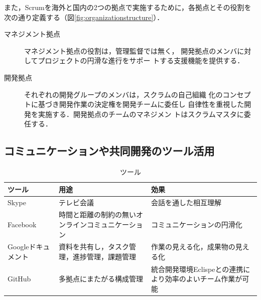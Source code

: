 \documentclass[a4j, 12Q, twocolumn, twoside]{jsarticle}
\begin{document}
また，Scrumを海外と国内の2つの拠点で実施するために，各拠点とその役割を次の通り定義する（図\ref{fig:organizationstructure}）．

\begin{description}
 \item[マネジメント拠点] マネジメント拠点の役割は，管理監督では無く，
	    開発拠点のメンバに対してプロジェクトの円滑な進行をサポー
	    トする支援機能を提供する．
 \item[開発拠点] それぞれの開発グループのメンバは，スクラムの自己組織
	    化のコンセプトに基づき開発作業の決定権を開発チームに委任し
	    自律性を重視した開発を実施する．開発拠点のチームのマネジメン
	    トはスクラムマスタに委任する．
\end{description}


\subsection{コミュニケーションや共同開発のツール活用}

\begin{table}
  \caption{ツール}
  \label{tb:Tools}
  \begin{center}
   \small
    \begin{tabular}{|p{}|p{}|p{}|}
      \hline
      ツール & 用途 & 効果 \\
      \hline
      Skype\cite{Skype} & テレビ会議 & 会話を通した相互理解 \\
      Facebook\cite{Facebook} &時間と距離の制約の無いオンラインコミュニケーション &コミュニケーションの円滑化 \\
      Googleドキュメント\cite{googledocument} & 資料を共有し，タスク管理，進捗管理，課題管理 & 作業の見える化，成果物の見える化 \\
      GitHub\cite{GitHub} & 多拠点にまたがる構成管理 &統合開発環境Eclispeとの連携により効率のよいチーム作業が可能 \\
      \hline
    \end{tabular}
  \end{center}
\end{table}
\end{document}
